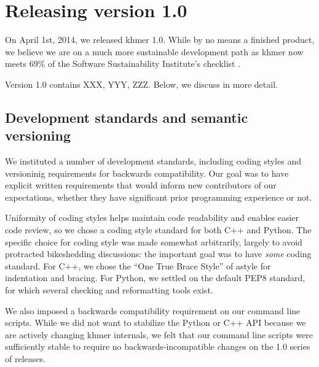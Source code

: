 \documentclass[11pt]{article}
\begin{document}

\section{Releasing version 1.0}

On April 1st, 2014, we released khmer 1.0.  While by no means a finished
product, we believe we are on a much more sustainable development path as khmer
now meets 69\% of the Software Sustainability Institute's checklist
\cite{khmer-1.0-assessment}.

Version 1.0 contains XXX, YYY, ZZZ.
Below, we discuss in more detail.



\subsection{Development standards and semantic versioning}

We instituted a number of development standards, including coding
styles and versioninig requirements for backwards compatibility.  Our
goal was to have explicit written requirements that would inform new
contributors of our expectations, whether they have significant prior
programming experience or not.

Uniformity of coding styles helps maintain code readability and
enables easier code review, so we chose a coding style standard for
both C++ and Python.  The specific choice for coding style was made
somewhat arbitrarily, largely to avoid protracted bikeshedding
discussions: the important goal was to have {\em some} coding
standard.  For C++, we chose the ``One True Brace Style'' of astyle
for indentation and bracing.  For Python, we settled on the default
PEP8 standard, for which several checking and reformatting tools
exist.

We also imposed a backwards compatibility requirement on our command
line scripts.  While we did not want to stabilize the Python or C++
API because we are actively changing khmer internals, we felt that
our command line scripts were sufficiently stable to require no
backwards-incompatible changes on the 1.0 series of releases.
\end{document}
